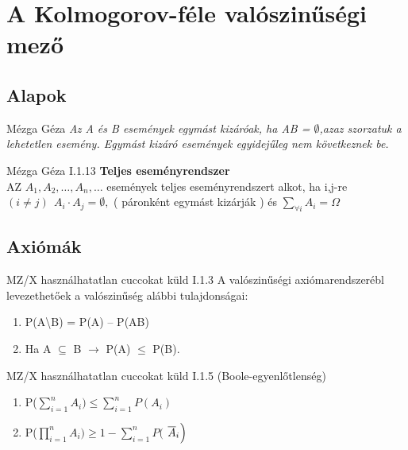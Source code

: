 \section{A Kolmogorov-féle valószinűségi mező}
\subsection{Alapok}

\begin{definicio}{Mézga Géza}
 \textit{Az A és B események egymást kizáróak, ha \textit{AB} = $\emptyset$,azaz szorzatuk a lehetetlen esemény. Egymást kizáró események egyidejűleg nem következnek be.}
\end{definicio}

\begin{definicio}{Mézga Géza}
I.1.13 \textbf{Teljes eseményrendszer} \\[4pt]
	 	AZ $A_1,A_2,\ldots ,A_n, \ldots $ események teljes eseményrendszert alkot, ha i,j-re $(i \neq j )\ \  A_i \cdot A_j = \emptyset, $ ( páronként egymást kizárják ) és $\sum\limits_{\forall i}A_i = \Omega $
\end{definicio}

\subsection{Axiómák}
	\begin{tetel}{MZ/X használhatatlan cuccokat küld}
  I.1.3 A valószinűségi axiómarendszerébl levezethetőek a valószinűség alábbi tulajdonságai:
	\begin{enumerate}
		\item P(A\textbackslash B) = P(A) -- P(AB)
		\item Ha  A $\subseteq$ B $\rightarrow$ P(A) $\leq$ P(B).
	\end{enumerate}
  \end{tetel}

	\begin{tetel}{MZ/X használhatatlan cuccokat küld}
  I.1.5 (Boole-egyenlőtlenség)
	\begin{enumerate}
		\item P\Bigg($\sum\limits_{i=1}^n A_i \Bigg) \leq \sum\limits_{i=1}^nP(A_i)$
		\item P\Bigg($\prod\limits_{i=1}^n A_i \Bigg) \geq 1 - \sum\limits_{i=1}^n P\Big( $ \hspace{0.2mm}$ \overline{A}_i \hspace{0.2mm}\Big) $
	\end{enumerate}
\end{tetel}

